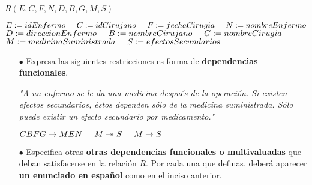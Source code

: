 \documentclass[12pt, letterpaper]{article}
\begin{document}
\begin{itemize}
\begin{center}
                        $R(E,C,F,N,D,B,G,M,S)$\vspace{.2cm}

                        $E:=idEnfermo \hspace{.5cm} C:=idCirujano \hspace{.5cm} F:=fechaCirugia \hspace{.5cm} N:=nombreEnfermo$ \\
                        
                        $D:=direccionEnfermo \hspace{.5cm} B:=nombreCirujano \hspace{.5cm} G:=nombreCirugia$ \\

                        $M:=medicinaSuministrada \hspace{.5cm} S:=efectosSecundarios$


                    \end{center}

                \begin{itemize}

                    \item[$\bullet$]    Expresa las siguientes restricciones es 
                                        forma de \textbf{dependencias funcionales}. 
                                        \vspace{.2cm}
                            
                                        \textit{"A un enfermo se le da una 
                                        medicina después de la operación. 
                                        Si existen efectos secundarios, 
                                        éstos dependen sólo de la medicina 
                                        suministrada. Sólo puede existir un 
                                        efecto secundario por medicamento."} \vspace{.3cm}

                                        $CBFG \rightarrow MEN \hspace{.5cm} M \twoheadrightarrow S \hspace{.5cm} M\rightarrow S$


                    \item[$\bullet$]    Especifica otras \textbf{otras dependencias 
                                        funcionales o multivaluadas} que deban 
                                        satisfacerse en la relación $R$. Por 
                                        cada una que definas, deberá aparecer 
                                        \textbf{un enunciado en español} como 
                                        en el inciso anterior. \vspace{.3cm}


\end{itemize}
\end{itemize}
\end{document}

